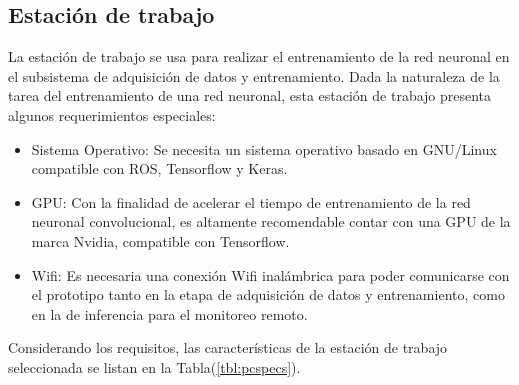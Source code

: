     \subsection{Estación de trabajo}
    La estación de trabajo se usa para realizar el entrenamiento de la red neuronal en el subsistema de adquisición de datos y 
    entrenamiento. Dada la naturaleza de la tarea del entrenamiento de una red neuronal, esta estación de trabajo presenta algunos 
    requerimientos especiales: 

    \begin{itemize}
        \item Sistema Operativo: Se necesita un sistema operativo basado en GNU/Linux compatible con ROS, Tensorflow y Keras.
        \item GPU: Con la finalidad de acelerar el tiempo de entrenamiento de la red neuronal convolucional, es altamente recomendable contar con una GPU de la marca Nvidia, compatible con Tensorflow.
        \item Wifi: Es necesaria una conexión Wifi inalámbrica para poder comunicarse con el prototipo tanto en la etapa de adquisición de datos y entrenamiento, como en la de inferencia para el monitoreo remoto.
    \end{itemize}
    
    Considerando los requisitos, las características de la estación de trabajo seleccionada se listan en la Tabla(\ref{tbl:pcspecs}). 

    \begin{table}[!h]
        \centering
        \caption[Características de la estación de trabajo seleccionada.]{Características de la estación de trabajo seleccionada. Fuente: Elaboración propia.}
        \label{tbl:pcspecs}
        \end{table}

